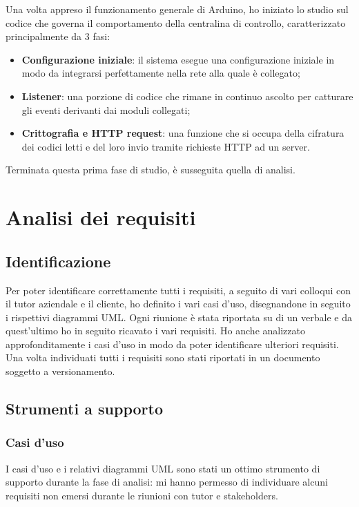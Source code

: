Una volta appreso il funzionamento generale di Arduino, ho iniziato lo studio sul codice che governa il comportamento della centralina di controllo, caratterizzato principalmente da 3 fasi:

\begin{itemize}
\item \textbf{Configurazione iniziale}: il sistema esegue una configurazione iniziale in modo da integrarsi perfettamente nella rete alla quale è collegato;
\item \textbf{Listener}: una porzione di codice che rimane in continuo ascolto per catturare gli eventi derivanti dai moduli collegati;
\item \textbf{Crittografia e HTTP request}: una funzione che si occupa della cifratura dei codici letti e del loro invio tramite richieste HTTP ad un server.
\end{itemize}

Terminata questa prima fase di studio, è susseguita quella di analisi.

\section{Analisi dei requisiti}
\subsection{Identificazione}
Per poter identificare correttamente tutti i requisiti, a seguito di vari colloqui con il tutor aziendale e il cliente, ho definito i vari casi d'uso, disegnandone in seguito i rispettivi diagrammi UML. Ogni riunione è stata riportata su di un verbale e da quest'ultimo ho in seguito ricavato i vari requisiti. Ho anche analizzato approfonditamente i casi d'uso in modo da poter identificare ulteriori requisiti. Una volta individuati tutti i requisiti sono stati riportati in un documento soggetto a versionamento.

\subsection{Strumenti a supporto}
\subsubsection{Casi d'uso}
I casi d'uso e i relativi diagrammi UML sono stati un ottimo strumento di supporto durante la fase di analisi: mi hanno permesso di individuare alcuni requisiti non emersi durante le riunioni con tutor e stakeholders.


